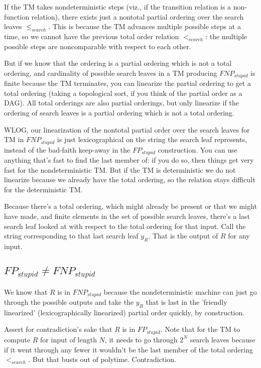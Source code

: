 \documentclass{article}
\begin{document}
If the TM takes nondeterministic steps (viz., if the transition relation is a non-function relation), there exists just a nontotal partial ordering over the search leaves $\leq_{search}$. This is because the TM advances multiple possible steps at a time, so we cannot have the previous total order relation $<_{search}$: the multiple possible steps are noncomparable with respect to each other.

But if we know that the ordering is a partial ordering which is not a total ordering, and cardinality of possible search leaves in a TM producing $FNP_{stupid}$ is finite because the TM terminates, you can linearize the partial ordering to get a total ordering (taking a topological sort, if you think of the partial order as a DAG). All total orderings are also partial orderings, but only linearize if the ordering of search leaves is a partial ordering which is not a total ordering.

WLOG, our linearization of the nontotal partial order over the search leaves for TM in $FNP_{stupid}$ is just lexicographical on the string the search leaf represents, instead of the bad-faith keep-away in the $FP_{stupid}$ construction. You can use anything that's fast to find the last member of: if you do so, then things get very fast for the nondeterministic TM. But if the TM is deterministic we do not linearize because we already have the total ordering, so the relation stays difficult for the deterministic TM.

Because there's a total ordering, which might already be present or that we might have made, and finite elements in the set of possible search leaves, there's a last search leaf looked at with respect to the total ordering for that input. Call the string corresponding to that last search leaf $y_R$. That is the output of $R$ for any input.

\subsection{$FP_{stupid} \neq FNP_{stupid}$}

We know that $R$ is in $FNP_{stupid}$ because the nondeterministic machine can just go through the possible outputs and take the $y_R$ that is last in the 'friendly linearized' (lexicographically linearized) partial order quickly, by construction.

Assert for contradiction's sake that $R$ is in $FP_{stupid}$. Note that for the TM to compute $R$ for input of length $N$, it needs to go through $2^N$ search leaves because if it went through any fewer it wouldn't be the last member of the total ordering $<_{search}$. But that busts out of polytime. Contradiction.
\end{document}
